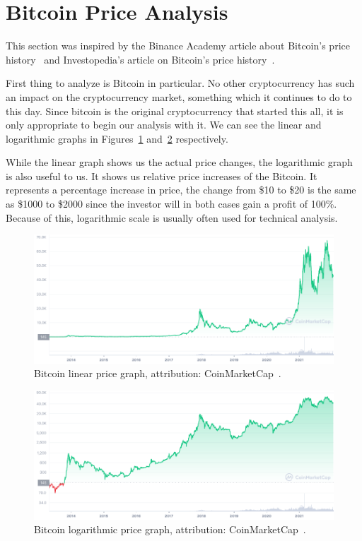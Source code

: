 \section{Bitcoin Price Analysis}
This section was inspired by the Binance Academy article about Bitcoin's price history~\cite{binance:bitcoin-price-history} and Investopedia's article on Bitcoin's price history~\cite{investopedia:bitcoin-price-history}.

First thing to analyze is Bitcoin in particular. No other cryptocurrency has such an impact on the cryptocurrency market, something which it continues to do to this day. Since bitcoin is the original cryptocurrency that started this all, it is only appropriate to begin our analysis with it. We can see the linear and logarithmic graphs in Figures~\ref{btc-linear-figure} and~\ref{btc-log-figure} respectively.

While the linear graph shows us the actual price changes, the logarithmic graph is also useful to us. It shows us relative price increases of the Bitcoin. It represents a percentage increase in price, the change from \$10 to \$20 is the same as \$1000 to \$2000 since the investor will in both cases gain a profit of 100\%. Because of this, logarithmic scale is usually often used for technical analysis.

\begin{figure}[!hbt]
    \centering
    \includegraphics[width=\columnwidth]{figures/BTC_ALL_linear.png}
    \caption{Bitcoin linear price graph, attribution: CoinMarketCap~\cite{coinmarketcap}.}
    \label{btc-linear-figure}
\end{figure}

\begin{figure}[!hbt]
    \centering
    \includegraphics[width=\columnwidth]{figures/BTC_ALL_log.png}
    \caption{Bitcoin logarithmic price graph, attribution: CoinMarketCap~\cite{coinmarketcap}.}
    \label{btc-log-figure}
\end{figure}

